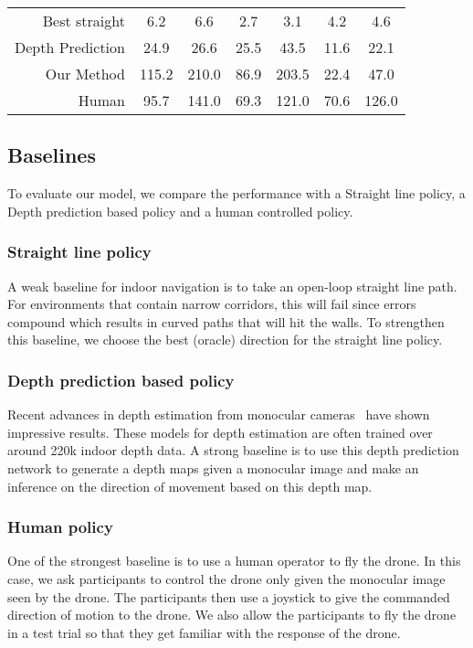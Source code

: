 \documentclass[letterpaper, 10 pt, conference]{ieeeconf}  %
\begin{document}
\begin{table*}[]
\begin{tabular}{rcccccc}
\multicolumn{1}{r|}{Best straight} & 6.2 & \multicolumn{1}{c|}{6.6} & 2.7 & \multicolumn{1}{c|}{3.1} & 4.2 & 4.6 \\
\multicolumn{1}{r|}{Depth Prediction} & 24.9 & \multicolumn{1}{c|}{26.6} & 25.5 & \multicolumn{1}{c|}{43.5} & 11.6 & 22.1 \\
\multicolumn{1}{r|}{Our Method} & 115.2 & \multicolumn{1}{c|}{210.0} & 86.9 & \multicolumn{1}{c|}{203.5} & 22.4 & 47.0 \\
\multicolumn{1}{r|}{Human} & 95.7 & \multicolumn{1}{c|}{141.0} & 69.3 & \multicolumn{1}{c|}{121.0} & 70.6 & 126.0
\end{tabular}
\end{table*}\subsection{Baselines}
To evaluate our model, we compare the performance with a Straight line policy, a Depth prediction based policy and a human controlled policy.

\subsubsection{Straight line policy}
A weak baseline for indoor navigation is to take an open-loop straight line path. For environments that contain narrow corridors, this will fail since errors compound which results in curved paths that will hit the walls. To strengthen this baseline, we choose the best (oracle) direction for the straight line policy.

\subsubsection{Depth prediction based policy}
Recent advances in depth estimation from monocular cameras~\cite{eigen2014depth} have shown impressive results. These models for depth estimation are often trained over around 220k indoor depth data. A strong baseline is to use this depth prediction network to generate a depth maps given a monocular image and make an inference on the direction of movement based on this depth map.

\subsubsection{Human policy}
One of the strongest baseline is to use a human operator to fly the drone. In this case, we ask participants to control the drone only given the monocular image seen by the drone. The participants then use a joystick to give the commanded direction of motion to the drone. We also allow the participants to fly the drone in a test trial so that they get familiar with the response of the drone.
\end{document}
